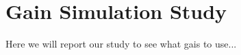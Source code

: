 \section{Gain Simulation Study}
\label{chUV_AID.UVSO3sim}

Here we will report our study to see what gais to use...
